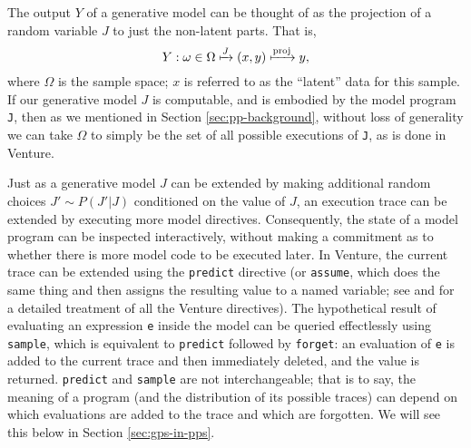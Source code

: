 \label{sec:interactivity}
The output $Y$ of a generative model can be thought of as the projection of a
random variable $J$ to just the non-latent parts.  That is,
\[ Y: \omega \in \Omega \xmapsto{J} (x,y) \xmapsto{\text{proj}} y, \]
where $\Omega$ is the sample space; $x$ is referred to as the ``latent'' data
for this sample.  If our generative model $J$ is computable, and is embodied by
the model program \texttt{J}, then as we mentioned in Section
\ref{sec:pp-background}, without loss of generality we can take $\Omega$ to
simply be the set of all possible executions of \texttt{J}, as is done in
Venture.

Just as a generative model $J$ can be extended by making additional random
choices $J' \sim P(J'|J)$ conditioned on the value of $J$, an execution trace
can be extended by executing more model directives.  Consequently, the state of
a model program can be inspected interactively, without making a commitment as
to whether there is more model code to be executed later.  In Venture, the
current trace can be extended using the \texttt{predict} directive (or
\texttt{assume}, which does the same thing and then assigns the resulting value
to a named variable; see \cite{VentureRefMan} and \cite{Venture} for a detailed
treatment of all the Venture directives).  The hypothetical result of evaluating
an expression \texttt{e} inside the model can be queried effectlessly using
\texttt{sample}, which is equivalent to \texttt{predict} followed by
\texttt{forget}: an evaluation of \texttt{e} is added to the current trace and
then immediately deleted, and the value is returned.  \texttt{predict} and
\texttt{sample} are not interchangeable; that is to say, the meaning of a
program (and the distribution of its possible traces) can depend on which
evaluations are added to the trace and which are forgotten.  We will see this
below in Section \ref{sec:gps-in-pps}.